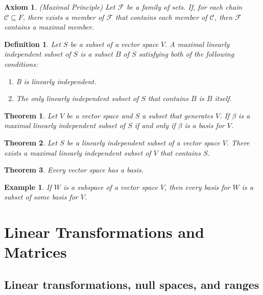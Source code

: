 \documentclass[a4paper]{article}
\newtheorem{mytheorem}{Theorem}
\newtheorem{example}{Example}
\newtheorem{axiom}{Axiom}
\newtheorem{mydef}{Definition}
\numberwithin{mytheorem}{section}
\numberwithin{mydef}{section}
\numberwithin{example}{section}
\begin{document}
\begin{axiom} (Maximal Principle) Let $\mathcal{F}$ be a family of sets. If, for each chain $\mathcal{C} \subseteq F$, there exists a member of $\mathcal{F}$ that contains each member of $\mathcal{C}$, then $\mathcal{F}$ contains a maximal member.
\end{axiom}

\begin{mydef} Let $S$ be a subset of a vector space $V$. A maximal linearly independent subset of $S$ is a subset $B$ of $S$ satisfying both of the following conditions:
\begin{enumerate}
\item B is linearly independent.
\item The only linearly independent subset of $S$ that contains $B$ is $B$ itself.
\end{enumerate}
\end{mydef}

\begin{mytheorem} Let $V$ be a vector space and $S$ a subset that generates $V$. If $\beta$ is a maximal linearly independent subset of $S$ if and only if $\beta$ is a basis for $V$.
\end{mytheorem}

\begin{mytheorem} Let $S$ be a linearly independent subset of a vector space $V$. There exists a maximal linearly independent subset of $V$ that contains $S$.
\end{mytheorem}

\begin{mytheorem} Every vector space has a basis.
\end{mytheorem}

\begin{example} If $W$ is a subspace of a vector space $V$, then every basis for $W$ is a subset of some basis for $V$.
\end{example}


\section{Linear Transformations and Matrices}

\subsection{Linear transformations, null spaces, and ranges}
\end{document}
